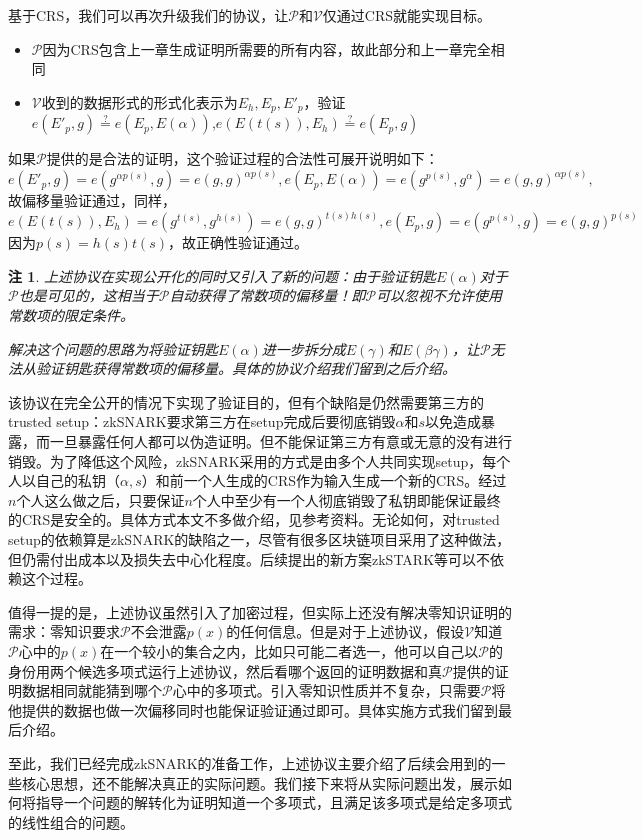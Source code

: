 \documentclass[12pt]{article}
\newcommand{\zk}{zkSNARK}
\newcommand{\pp}{$\mathcal{P}$}
\newcommand{\vv}{$\mathcal{V}$}
\newtheorem{remark}{注}[section]
\begin{document}
基于CRS，我们可以再次升级我们的协议，让\pp 和\vv 仅通过CRS就能实现目标。
\begin{itemize}
	\item \pp 因为CRS包含上一章生成证明所需要的所有内容，故此部分和上一章完全相同
	\item \vv 收到的数据形式的形式化表示为$E_h,E_p,E'_p$，验证\\$e(E'_p,g)\overset{?}{=} e(E_p,E(\alpha))$,$e(E(t(s)),E_h) \overset{?}{=} e(E_p,g)$
\end{itemize}
如果\pp 提供的是合法的证明，这个验证过程的合法性可展开说明如下：
$$e(E'_p,g) = e(g^{\alpha p(s)},g)=e(g,g)^{\alpha p(s)}, e(E_p,E(\alpha))=e(g^{p(s)},g^\alpha)=e(g,g)^{\alpha p(s)},$$
故偏移量验证通过，同样，
$$e(E(t(s)),E_h)=e(g^{t(s)},g^{h(s)})=e(g,g)^{t(s)h(s)}, e(E_p,g)=e(g^{p(s)},g)=e(g,g)^{p(s)}$$
因为$p(s)=h(s)t(s)$，故正确性验证通过。
\begin{remark}
\label{shift}
	上述协议在实现公开化的同时又引入了新的问题：由于验证钥匙$E(\alpha)$对于\pp 也是可见的，这相当于\pp 自动获得了常数项的偏移量！即\pp 可以忽视不允许使用常数项的限定条件。

	解决这个问题的思路为将验证钥匙$E(\alpha)$进一步拆分成$E(\gamma)$和$E(\beta\gamma)$，让\pp 无法从验证钥匙获得常数项的偏移量。具体的协议介绍我们留到之后介绍。
\end{remark}
该协议在完全公开的情况下实现了验证目的，但有个缺陷是仍然需要第三方的trusted setup：\zk 要求第三方在setup完成后要彻底销毁$\alpha$和$s$以免造成暴露，而一旦暴露任何人都可以伪造证明。但不能保证第三方有意或无意的没有进行销毁。为了降低这个风险，\zk 采用的方式是由多个人共同实现setup，每个人以自己的私钥（$\alpha,s$）和前一个人生成的CRS作为输入生成一个新的CRS。经过$n$个人这么做之后，只要保证$n$个人中至少有一个人彻底销毁了私钥即能保证最终的CRS是安全的。具体方式本文不多做介绍，见参考资料。无论如何，对trusted setup的依赖算是\zk 的缺陷之一，尽管有很多区块链项目采用了这种做法，但仍需付出成本以及损失去中心化程度。后续提出的新方案zkSTARK等可以不依赖这个过程。

值得一提的是，上述协议虽然引入了加密过程，但实际上还没有解决零知识证明的需求：零知识要求\pp 不会泄露$p(x)$的任何信息。但是对于上述协议，假设\vv 知道\pp 心中的$p(x)$在一个较小的集合之内，比如只可能二者选一，他可以自己以\pp 的身份用两个候选多项式运行上述协议，然后看哪个返回的证明数据和真\pp 提供的证明数据相同就能猜到哪个\pp 心中的多项式。引入零知识性质并不复杂，只需要\pp 将他提供的数据也做一次偏移同时也能保证验证通过即可。具体实施方式我们留到最后介绍。

至此，我们已经完成\zk 的准备工作，上述协议主要介绍了后续会用到的一些核心思想，还不能解决真正的实际问题。我们接下来将从实际问题出发，展示如何将指导一个问题的解转化为证明知道一个多项式，且满足该多项式是给定多项式的线性组合的问题。
\end{document}
